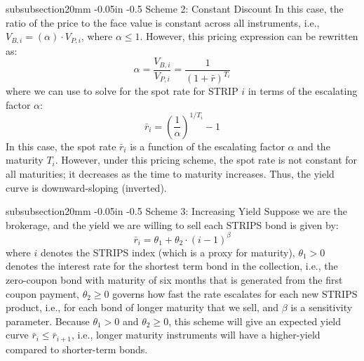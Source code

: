 \documentclass[11pt]{article}
\makeatletter
\theoremstyle{definition}
\renewcommand\subsubsection{\@startsection
	{subsubsection}{2}{0mm}
	{-0.05in}
	{-0.5\baselineskip}
	{\normalfont\normalsize\itshape\bfseries}}
\makeatother
\begin{document}
\subsubsection{Scheme 2: Constant Discount}
In this case, the ratio of the price to the face value is constant across all instruments, i.e., $V_{B, i} = \left(\alpha\right)\cdot{V}_{P, i}$, where $\alpha\leq{1}$. However, this pricing expression can be rewritten as:
\begin{equation}
\alpha = \frac{V_{B,i}}{V_{P,i}} = \frac{1}{\left(1+\bar{r}\right)^{T_{i}}}
\end{equation}
where we can use to solve for the spot rate for STRIP $i$ in terms of the escalating factor $\alpha$:
\begin{equation}
\bar{r}_{i} = \left(\frac{1}{\alpha}\right)^{1/T_{i}} - 1
\end{equation}
In this case, the spot rate $\bar{r}_{i}$ is a function of the escalating factor $\alpha$ and the maturity $T_{i}$. 
However, under this pricing scheme, the spot rate is not constant for all maturities; it decreases as the time to maturity increases. Thus, the yield curve is downward-sloping (inverted).

\subsubsection{Scheme 3: Increasing Yield}
Suppose we are the brokerage, and the yield we are willing to sell each STRIPS bond is given by:
\begin{equation}
\bar{r}_{i} = \theta_{1}+\theta_{2}\cdot\left(i-1\right)^{\beta}
\end{equation}
where $i$ denotes the STRIPS index (which is a proxy for maturity), 
$\theta_{1}>0$ denotes the interest rate for the shortest term bond in the collection, i.e., the zero-coupon bond with maturity of six months that is generated from the first coupon payment, $\theta_{2}\geq{0}$ governs how fast the rate escalates for each new STRIPS product, i.e., for each bond of longer maturity that we sell, and $\beta$ is a sensitivity parameter. Because $\theta_{1}>{0}$ and $\theta_{2}\geq{0}$, this scheme will give an expected yield curve $\bar{r}_{i}\leq\bar{r}_{i+1}$, i.e., longer maturity instruments will have a higher-yield compared to shorter-term bonds.
\end{document}
